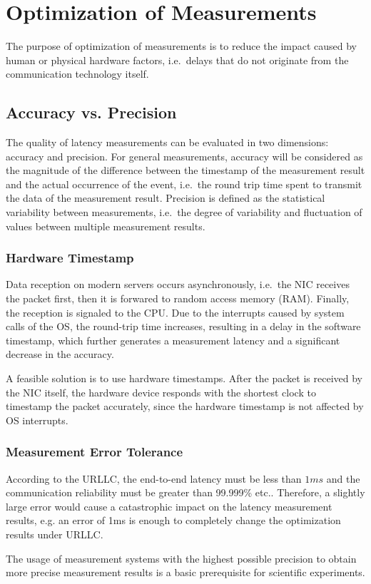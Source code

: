 \section{Optimization of Measurements}
The purpose of optimization of measurements is to reduce the impact caused by human or physical
hardware factors, i.e.\ delays that do not originate from the communication technology itself.

\subsection{Accuracy vs. Precision}
The quality of latency measurements can be evaluated in two dimensions: accuracy and
precision\cite{b13}.
For general measurements, accuracy will be considered as the magnitude of the difference
between the timestamp of the measurement result and the actual occurrence of the event,
i.e.\ the round trip time spent to transmit the data of the measurement result.
Precision is defined as the statistical variability between measurements, i.e.\ the degree
of variability and fluctuation of values between multiple measurement results.

\subsubsection{Hardware Timestamp}
Data reception on modern servers occurs asynchronously, i.e.\ the NIC receives the packet
first, then it is forwared to random access memory (RAM). Finally, the reception is
signaled to the CPU\cite{b13}.
Due to the interrupts caused by system calls of the OS\cite{b2}, the round-trip time
increases, resulting in a delay in the software timestamp, which further generates a
measurement latency and a significant decrease in the accuracy.

A feasible solution is to use hardware timestamps.
After the packet is received by the NIC itself, the hardware device responds with
the shortest clock to timestamp the packet accurately, since the hardware timestamp
is not affected by OS interrupts\cite{b13}.

\subsubsection{Measurement Error Tolerance}
According to the URLLC, the end-to-end latency must be
less than $\si{1}{ms}$ and the communication reliability must be greater
than 99.999\% etc.\cite{b3,b4,b5}.
Therefore, a slightly large error would cause a catastrophic impact on the latency
measurement results, e.g. an error of 1ms is enough to completely
change the optimization results under URLLC.

The usage of measurement systems with the highest possible precision to obtain more precise
measurement results is a basic prerequisite for scientific experiments.






